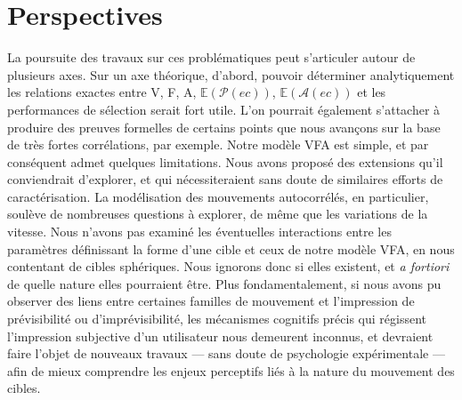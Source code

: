 	\section*{Perspectives}
	La poursuite des travaux sur ces problématiques peut s'articuler autour de plusieurs axes. Sur un axe théorique, d'abord, pouvoir déterminer analytiquement les relations exactes entre V, F, A, $\mathbb{E}(\mathcal{P}(ec))$, $\mathbb{E}(\mathcal{A}(ec))$ et les performances de sélection serait fort utile. L'on pourrait également s'attacher à produire des preuves formelles de certains points que nous avançons sur la base de très fortes corrélations, par exemple. Notre modèle VFA est simple, et par conséquent admet quelques limitations. Nous avons proposé des extensions qu'il conviendrait d'explorer, et qui nécessiteraient sans doute de similaires efforts de caractérisation. La modélisation des mouvements autocorrélés, en particulier, soulève de nombreuses questions à explorer, de même que les variations de la vitesse. Nous n'avons pas examiné les éventuelles interactions entre les paramètres définissant la forme d'une cible et ceux de notre modèle VFA, en nous contentant de cibles sphériques. Nous ignorons donc si elles existent, et \emph{a fortiori} de quelle nature elles pourraient être. Plus fondamentalement, si nous avons pu observer des liens entre certaines familles de mouvement et l'impression de prévisibilité ou d'imprévisibilité, les mécanismes cognitifs précis qui régissent l'impression subjective d'un utilisateur nous demeurent inconnus, et devraient faire l'objet de nouveaux travaux --- sans doute de psychologie expérimentale --- afin de mieux comprendre les enjeux perceptifs liés à la nature du mouvement des cibles.
	
